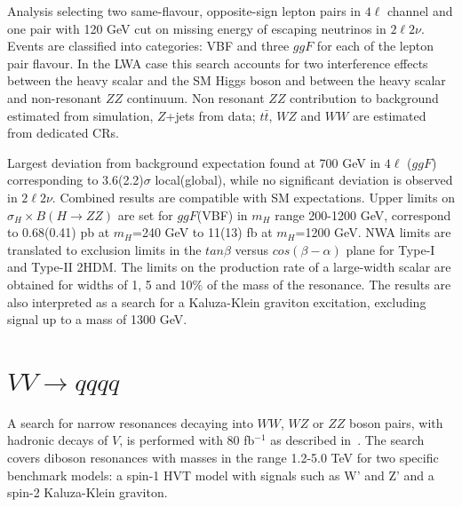 \documentclass{PoS}
\begin{document}
Analysis selecting two same-flavour, opposite-sign lepton pairs in $4\ell$ channel and one pair with 120 GeV cut on missing energy of escaping neutrinos in $2\ell2\nu$.
Events are classified into categories: VBF and three $ggF$ for each of the lepton pair flavour.
In the LWA case this search accounts for two interference effects between the heavy scalar and the SM Higgs boson and between the heavy scalar and non-resonant $ZZ$ continuum.
Non resonant $ZZ$ contribution to background estimated from simulation, $Z$+jets from data; $t\bar{t}$, $WZ$ and $WW$ are estimated from dedicated CRs.

Largest deviation from background expectation found at 700 GeV in $4\ell$ ($ggF$) corresponding to 3.6(2.2)$\sigma$ local(global), while no significant deviation is observed in $2\ell2\nu$. Combined results are compatible with SM expectations. 
Upper limits on $\sigma_H \times B(H\rightarrow ZZ)$ are set for $ggF$(VBF) in $m_H$ range 200-1200 GeV, correspond to 0.68(0.41) pb at $m_H$=240 GeV to 11(13) fb at $m_H$=1200 GeV. NWA limits are translated to exclusion limits in the $tan \beta$ versus $cos(\beta-\alpha)$ plane for Type-I and Type-II 2HDM. The limits on the production rate of a large-width scalar are obtained for widths of 1, 5 and 10\% of the mass of the resonance.
The results are also interpreted as a search for a Kaluza-Klein graviton excitation, excluding signal up to a mass of 1300 GeV. 


\section{$VV\rightarrow qqqq$}
\label{sec:VV}
A search for narrow resonances decaying into $WW$, $WZ$ or $ZZ$ boson pairs, with hadronic decays of $V$, is performed with 80 fb$^{-1}$ as described in~\cite{ATLAS-CONF-2018-016}. The search covers diboson resonances with masses in the range 1.2-5.0 TeV for two specific benchmark models: a spin-1 HVT model with signals such as W' and Z' and a spin-2 Kaluza-Klein graviton.
\end{document}
